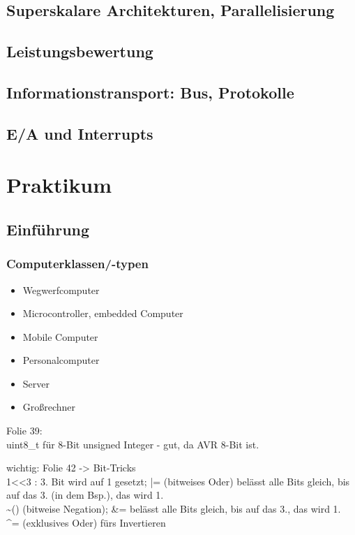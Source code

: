 \chapter{Superskalare Architekturen, Parallelisierung}

\chapter{Leistungsbewertung}

\chapter{Informationstransport: Bus, Protokolle}

\chapter{E/A und Interrupts}

\part{Praktikum}

\chapter{Einführung}

\section{Computerklassen/-typen}
\begin{itemize}
\item Wegwerfcomputer
\item Microcontroller, embedded Computer
\item Mobile Computer
\item Personalcomputer
\item Server
\item Großrechner
\end{itemize}


Folie 39: \\
uint8\_t für 8-Bit unsigned Integer - gut, da AVR 8-Bit ist.

wichtig: Folie 42 -> Bit-Tricks\\
1<<3 : 3. Bit wird auf 1 gesetzt; |= (bitweises Oder) belässt alle Bits gleich, bis auf das 3. (in dem Bsp.), das wird 1.\\
\textasciitilde() (bitweise Negation); \&= belässt alle Bits gleich, bis auf das 3., das wird 1.\\
\^{}= (exklusives Oder) fürs Invertieren



